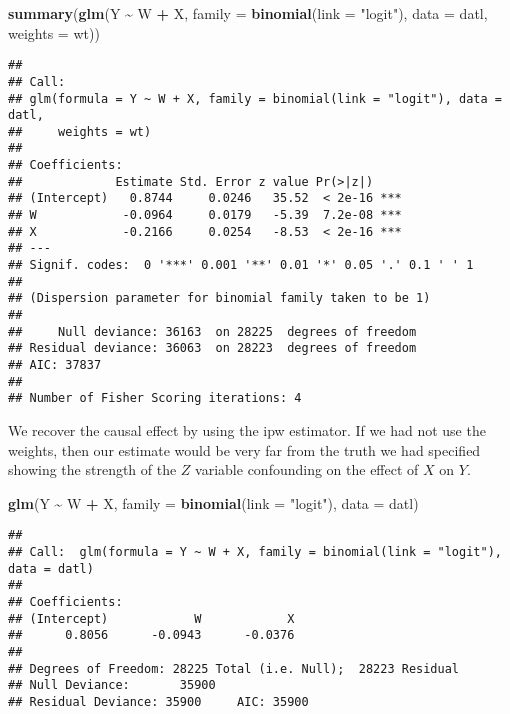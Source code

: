 \documentclass[
]{article}
\newenvironment{Shaded}{\begin{snugshade}}{\end{snugshade}}
\newcommand{\AttributeTok}[1]{\textcolor[rgb]{0.13,0.29,0.53}{#1}}
\newcommand{\FunctionTok}[1]{\textcolor[rgb]{0.13,0.29,0.53}{\textbf{#1}}}
\newcommand{\NormalTok}[1]{#1}
\newcommand{\SpecialCharTok}[1]{\textcolor[rgb]{0.81,0.36,0.00}{\textbf{#1}}}
\newcommand{\StringTok}[1]{\textcolor[rgb]{0.31,0.60,0.02}{#1}}
\begin{document}
\begin{Shaded}
\begin{Highlighting}[]
\FunctionTok{summary}\NormalTok{(}\FunctionTok{glm}\NormalTok{(Y }\SpecialCharTok{\textasciitilde{}}\NormalTok{ W }\SpecialCharTok{+}\NormalTok{ X, }\AttributeTok{family =} \FunctionTok{binomial}\NormalTok{(}\AttributeTok{link =} \StringTok{"logit"}\NormalTok{), }\AttributeTok{data =}\NormalTok{ datl,}
                    \AttributeTok{weights =}\NormalTok{ wt))}
\end{Highlighting}
\end{Shaded}

\begin{verbatim}
## 
## Call:
## glm(formula = Y ~ W + X, family = binomial(link = "logit"), data = datl, 
##     weights = wt)
## 
## Coefficients:
##             Estimate Std. Error z value Pr(>|z|)    
## (Intercept)   0.8744     0.0246   35.52  < 2e-16 ***
## W            -0.0964     0.0179   -5.39  7.2e-08 ***
## X            -0.2166     0.0254   -8.53  < 2e-16 ***
## ---
## Signif. codes:  0 '***' 0.001 '**' 0.01 '*' 0.05 '.' 0.1 ' ' 1
## 
## (Dispersion parameter for binomial family taken to be 1)
## 
##     Null deviance: 36163  on 28225  degrees of freedom
## Residual deviance: 36063  on 28223  degrees of freedom
## AIC: 37837
## 
## Number of Fisher Scoring iterations: 4
\end{verbatim}

We recover the causal effect by using the ipw estimator. If we had not
use the weights, then our estimate would be very far from the truth we
had specified showing the strength of the \(Z\) variable confounding on
the effect of \(X\) on \(Y\).

\begin{Shaded}
\begin{Highlighting}[]
\FunctionTok{glm}\NormalTok{(Y }\SpecialCharTok{\textasciitilde{}}\NormalTok{ W }\SpecialCharTok{+}\NormalTok{ X, }\AttributeTok{family =} \FunctionTok{binomial}\NormalTok{(}\AttributeTok{link =} \StringTok{"logit"}\NormalTok{), }\AttributeTok{data =}\NormalTok{ datl)}
\end{Highlighting}
\end{Shaded}

\begin{verbatim}
## 
## Call:  glm(formula = Y ~ W + X, family = binomial(link = "logit"), data = datl)
## 
## Coefficients:
## (Intercept)            W            X  
##      0.8056      -0.0943      -0.0376  
## 
## Degrees of Freedom: 28225 Total (i.e. Null);  28223 Residual
## Null Deviance:       35900 
## Residual Deviance: 35900     AIC: 35900
\end{verbatim}
\end{document}
